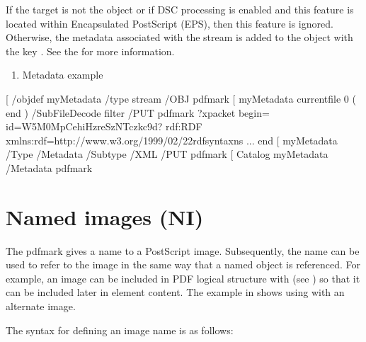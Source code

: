 \documentclass[letterpaper,12pt,english,openany,oneside]{sphinxmanual}
\begin{document}
If the target is not the  object or if DSC processing is enabled and this feature is located within Encapsulated PostScript (EPS), then this feature is ignored. Otherwise, the metadata associated with the stream  is added to the  object with the key  . See the  for more information.
\begin{enumerate}
%
\item {} 
Metadata example

\end{enumerate}

\begin{sphinxVerbatim}[commandchars=\\\{\}]
[ /\PYGZus{}objdef \PYGZob{}myMetadata\PYGZcb{} /type stream /OBJ pdfmark
   [   \PYGZob{}myMetadata\PYGZcb{} currentfile 0 (\PYGZpc{} \PYGZhy{}\PYGZhy{} end \PYGZhy{}\PYGZhy{}) /SubFileDecode filter /PUT pdfmark
   \PYGZlt{}?xpacket begin=\PYGZsq{}\PYGZsq{} id=\PYGZsq{}W5M0MpCehiHzreSzNTczkc9d\PYGZsq{}?\PYGZgt{}
   \PYGZlt{}rdf:RDF xmlns:rdf=\PYGZsq{}http://www.w3.org/1999/02/22\PYGZhy{}rdf\PYGZhy{}syntax\PYGZhy{}ns\PYGZsh{}\PYGZsq{}
   ...
   \PYGZpc{} \PYGZhy{}\PYGZhy{} end \PYGZhy{}\PYGZhy{}
   [   \PYGZob{}myMetadata\PYGZcb{} \PYGZlt{}\PYGZlt{} /Type /Metadata /Subtype /XML\PYGZgt{}\PYGZgt{} /PUT pdfmark
   [   \PYGZob{}Catalog\PYGZcb{} \PYGZob{}myMetadata\PYGZcb{} /Metadata pdfmark
\end{sphinxVerbatim}


\section{Named images (NI)}
\label{\detokenize{pdfmark_Basic:named-images-ni}}
The  pdfmark gives a name to a PostScript image. Subsequently, the name can be used to refer to the image in the same way that a named object is referenced. For example, an image can be included in PDF logical structure with  (see ) so that it can be included later in element content. The example in  shows using  with an alternate image.

The syntax for defining an image name is as follows:
\end{document}
